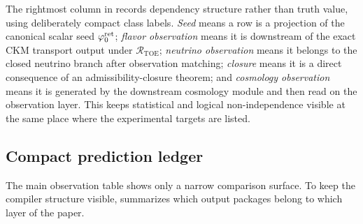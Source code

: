 \begin{table}[t]
{\begin{tabular}
\bottomrule
\end{tabular}}
\caption{Operational prediction set with explicit status and dependency classes.}
\label{tab:operational-prediction-set}
\end{table}

\begin{remark}
The rightmost column in  records dependency structure
rather than truth value, using deliberately compact class labels. \emph{Seed} means a row is a
projection of the canonical scalar seed $\varphi_0^{\mathrm{ret}}$; \emph{flavor observation} means it is
downstream of the exact CKM transport output under $\mathcal R_{\mathrm{TOE}}$; \emph{neutrino
observation} means it belongs to the closed neutrino branch after observation matching;
\emph{closure} means it is a direct consequence of an admissibility-closure theorem; and
\emph{cosmology observation} means it is generated by the downstream cosmology module and then
read on the observation layer. This keeps statistical and logical non-independence visible at the same place
where the experimental targets are listed.
\end{remark}

\subsection{Compact prediction ledger}

The main observation table shows only a narrow comparison surface. To keep the compiler
structure visible,  summarizes which output packages belong to which
layer of the paper.

